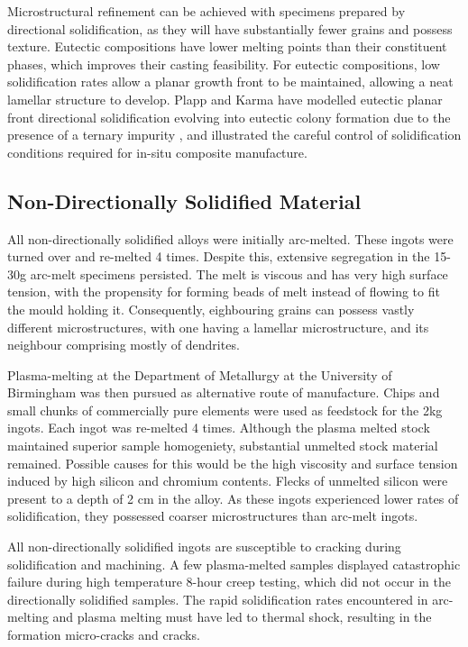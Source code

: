 \documentclass[preprint]{elsarticle}
\begin{document}
Microstructural refinement can be achieved with specimens prepared by directional solidification, as they will have substantially fewer grains and possess texture. Eutectic compositions have lower melting points than their constituent phases, which improves their casting feasibility. For eutectic compositions, low solidification rates allow a planar growth front to be maintained, allowing a neat lamellar structure to develop. Plapp and Karma have modelled eutectic planar front directional solidification evolving into eutectic colony formation due to the presence of a ternary impurity \cite{plapp02}, and illustrated the careful control of solidification conditions required for in-situ composite manufacture. 

\subsection{Non-Directionally Solidified Material}

All non-directionally solidified alloys were initially arc-melted. These ingots were turned over and re-melted 4 times. Despite this, extensive segregation in the 15-30g arc-melt specimens persisted. The melt is viscous and has very high surface tension, with the propensity for forming beads of melt instead of flowing to fit the mould holding it. Consequently, eighbouring grains can possess vastly different microstructures, with one having a lamellar microstructure, and its neighbour comprising mostly of dendrites. 

Plasma-melting at the Department of Metallurgy at the University of Birmingham was then pursued as alternative route of manufacture. Chips and small chunks of commercially pure elements were used as feedstock for the 2kg ingots. Each ingot was re-melted 4 times. Although the plasma melted stock maintained superior sample homogeniety, substantial unmelted stock material remained. Possible causes for this would be the high viscosity and surface tension induced by high silicon and chromium contents. Flecks of unmelted silicon were present to a depth of 2 cm in the alloy. As these ingots experienced lower rates of solidification, they possessed coarser microstructures than arc-melt ingots. 

All non-directionally solidified ingots are susceptible to cracking during solidification and machining. A few plasma-melted samples displayed catastrophic failure during high temperature 8-hour creep testing, which did not occur in the directionally solidified samples. The rapid solidification rates encountered in arc-melting and plasma melting must have led to thermal shock, resulting in the formation micro-cracks and cracks.
\end{document}
